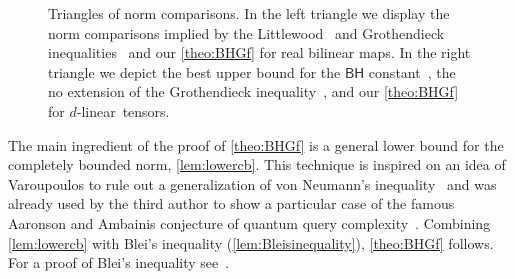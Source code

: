 \documentclass[11pt]{article}
\newcommand{\BH}{\textsf{BH}}
\newcommand{\node}{\mathrm{node}}
\theoremstyle{plain}
\DeclareMathOperator{\cb}{cb}
\renewcommand{\cb}{{\mathrm{cb}}}
\newcommand{\poly}{\mbox{\rm poly}}
\theoremstyle{plain}
\theoremstyle{definition}
\theoremstyle{remark}
\theoremstyle{named}
\begin{document}
\begin{figure}[ht]
    \centering
    \hfill 
    \begin{minipage}{0.45\textwidth}
    \end{minipage}
    \hfill
    \begin{minipage}{0.45\textwidth}
    \end{minipage}
    \caption{Triangles of norm comparisons. In the left triangle we display the norm comparisons implied by the Littlewood~\cite{littlewood1930bounded} and Grothendieck inequalities~\cite{grothendieck1953resume} and our \cref{theo:BHGf} for real bilinear maps. In the right triangle we depict the best upper bound for the $\BH$ constant~\cite{bayart2014bohr}, the no extension of the Grothendieck inequality~\cite{perez2008unbounded}, and our \cref{theo:BHGf} for $d$-linear~tensors.}\label{fig:normcomparisons}
\end{figure}
The main ingredient of the proof of \cref{theo:BHGf} is a general lower bound for the completely bounded norm, \cref{lem:lowercb}. This technique is inspired on an idea of Varoupoulos to rule out a generalization of von Neumann's inequality~\cite{Varopoulos:1974} and was already used by the third author to show a particular case of the famous Aaronson and Ambainis conjecture of quantum query complexity~\cite{gutierrez2023influences}. Combining \cref{lem:lowercb} with Blei's inequality (\cref{lem:Bleisinequality}), \cref{theo:BHGf} follows. For a proof of Blei's inequality see~\cite[Theorem 2.1]{bayart2014bohr}.
\end{document}
